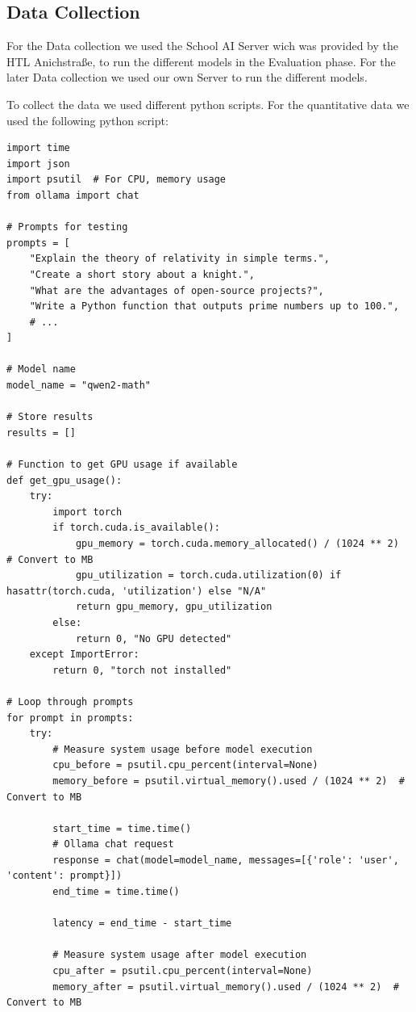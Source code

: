 \cite{Ollama-models-overview}


\subsection{Data Collection}

For the Data collection we used the School AI Server wich was provided by the HTL Anichstraße, to run the different models in the Evaluation phase.
For the later Data collection we used our own Server to run the different models.

To collect the data we used different python scripts. For the quantitative data we used the following python script:

\begin{lstlisting}[style=Python, caption={Python-quantitative-data-collection}, captionpos=b]
import time
import json
import psutil  # For CPU, memory usage
from ollama import chat

# Prompts for testing
prompts = [
    "Explain the theory of relativity in simple terms.",
    "Create a short story about a knight.",
    "What are the advantages of open-source projects?",
    "Write a Python function that outputs prime numbers up to 100.",
    # ...
]

# Model name
model_name = "qwen2-math"

# Store results
results = []

# Function to get GPU usage if available
def get_gpu_usage():
    try:
        import torch
        if torch.cuda.is_available():
            gpu_memory = torch.cuda.memory_allocated() / (1024 ** 2)  # Convert to MB
            gpu_utilization = torch.cuda.utilization(0) if hasattr(torch.cuda, 'utilization') else "N/A"
            return gpu_memory, gpu_utilization
        else:
            return 0, "No GPU detected"
    except ImportError:
        return 0, "torch not installed"

# Loop through prompts
for prompt in prompts:
    try:
        # Measure system usage before model execution
        cpu_before = psutil.cpu_percent(interval=None)
        memory_before = psutil.virtual_memory().used / (1024 ** 2)  # Convert to MB

        start_time = time.time()
        # Ollama chat request
        response = chat(model=model_name, messages=[{'role': 'user', 'content': prompt}])
        end_time = time.time()

        latency = end_time - start_time

        # Measure system usage after model execution
        cpu_after = psutil.cpu_percent(interval=None)
        memory_after = psutil.virtual_memory().used / (1024 ** 2)  # Convert to MB


\end{lstlisting}
